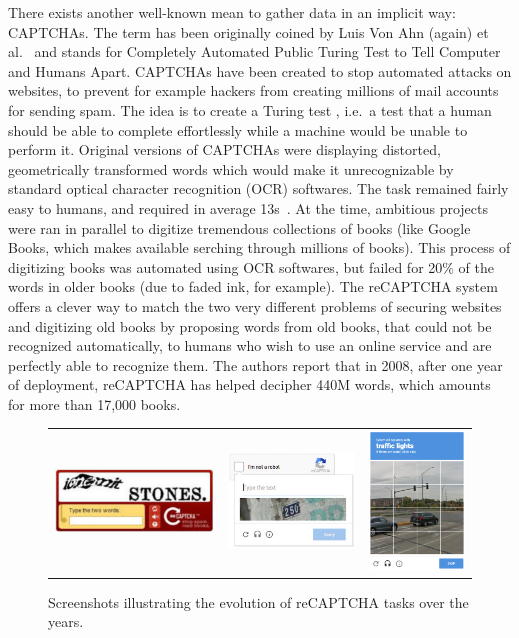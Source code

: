 There exists another well-known mean to gather data in an implicit way: CAPTCHAs.
The term has been originally coined by
Luis Von Ahn (again) et al.~\cite{von2003captcha} and stands for
Completely Automated Public Turing Test to Tell Computer and Humans Apart.
CAPTCHAs have been created to stop automated attacks on websites,
to prevent for example hackers from creating millions of mail accounts for sending spam.
The idea is to create a Turing test \cite{machinery1950computing},
i.e.\ a test that a human should be able to complete effortlessly
while a machine would be unable to perform it.
Original versions of CAPTCHAs were displaying distorted,
geometrically transformed words which would make it unrecognizable
by standard optical character recognition (OCR) softwares.
The task remained fairly easy to humans,
and required in average 13s~\cite{von2008recaptcha}.
At the time, ambitious projects were ran in parallel to digitize
tremendous collections of books
(like Google Books, which makes available serching through millions of books).
This process of digitizing books was automated using OCR softwares,
but failed for 20\% of the words in older books (due to faded ink, for example).
The reCAPTCHA system offers a clever way to match the two very different
problems of securing websites and digitizing old books by proposing words from old books,
that could not be recognized automatically,
to humans who wish to use an online service and are perfectly able to recognize them.
The authors report that in 2008, after one year of deployment,
reCAPTCHA has helped decipher 440M words, which amounts for more than 17,000 books.

\begin{figure}
	\centering
	\begin{tabular}{ccc}
\includegraphics[width=5cm]{assets/img/recaptcha.png} & \includegraphics[width=4cm]{assets/img/recaptcha-streetview.jpg} &
\includegraphics[width=3cm]{assets/img/reCAPTCHA_v2.png} \\
	\end{tabular}
	\caption{Screenshots illustrating the evolution of reCAPTCHA \cite{von2008recaptcha} tasks over the years.}
	\label{fig:recaptcha}
\end{figure}


